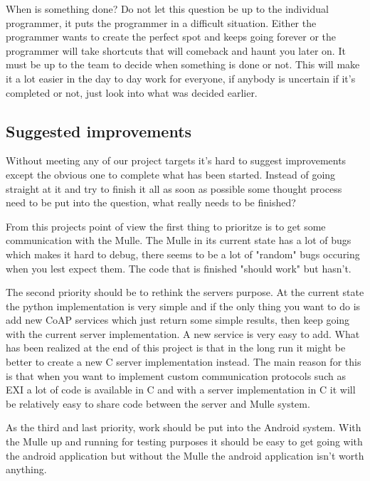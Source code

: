 When is something done?
Do not let this question be up to the individual programmer, it puts the programmer in a difficult situation.
Either the programmer wants to create the perfect spot and keeps going forever or the programmer will take shortcuts that will comeback and haunt you later on.
It must be up to the team to decide when something is done or not.
This will make it a lot easier in the day to day work for everyone, if anybody is uncertain if it's completed or not, just look into what was decided earlier.
\subsection{Suggested improvements}
Without meeting any of our project targets it's hard to suggest improvements except the obvious one to complete what has been started. 
Instead of going straight at it and try to finish it all as soon as possible some thought process need to be put into the question, what really needs to be finished?

From this projects point of view the first thing to prioritze is to get some communication with the Mulle.
The Mulle in its current state has a lot of bugs which makes it hard to debug, there seems to be a lot of "random" bugs occuring when you lest expect them. 
The code that is finished "should work" but hasn't.

The second priority should be to rethink the servers purpose.
At the current state the python implementation is very simple and if the only thing you want to do is add new CoAP services which just return some simple results, then keep going with the current server implementation.
A new service is very easy to add.
What has been realized at the end of this project is that in the long run it might be better to create a new C server implementation instead.
The main reason for this is that when you want to implement custom communication protocols such as EXI a lot of code is available in C and with a server implementation in C it will be relatively easy to share code between the server and Mulle system.

As the third and last priority, work should be put into the Android system. With the Mulle up and running for testing purposes it should be easy to get going with the android application but without the Mulle the android application isn't worth anything.



%
%
